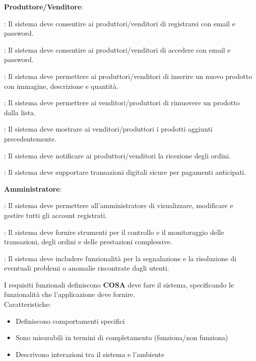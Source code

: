 \begin{rfenum}
    \item \textbf{Produttore/Venditore}:
        \begin{rfenum}
            \item : Il sistema deve consentire ai produttori/venditori di registrarsi con email e password.
            \item : Il sistema deve consentire ai produttori/venditori di accedere con email e password.
            \item : Il sistema deve permettere ai produttori/venditori di inserire un nuovo prodotto con immagine, descrizione e quantità.
            \item: Il sistema deve permettere ai venditori/produttori di rimuovere un prodotto dalla lista.
            \item: Il sistema deve mostrare ai venditori/produttori i prodotti aggiunti precedentemente.
            \item : Il sistema deve notificare ai produttori/venditori la ricezione degli ordini.
            \item : Il sistema deve supportare transazioni digitali sicure per pagamenti anticipati.
        \end{rfenum}
        
    \item \textbf{Amministratore}:
        \begin{rfenum}
            \item : Il sistema deve permettere all'amministratore di visualizzare, modificare e gestire tutti gli account registrati.
            \item : Il sistema deve fornire strumenti per il controllo e il monitoraggio delle transazioni, degli ordini e delle prestazioni complessive.
            \item : Il sistema deve includere funzionalità per la segnalazione e la risoluzione di eventuali problemi o anomalie riscontrate dagli utenti.
        \end{rfenum}
\end{rfenum}

\newpage
I requisiti funzionali definiscono \textbf{COSA} deve fare il sistema, specificando le funzionalità che l'applicazione deve fornire.\\
Caratteristiche:
\begin{itemize}
    \item Definiscono comportamenti specifici
    \item Sono misurabili in termini di completamento (funziona/non funziona)
    \item Descrivono interazioni tra il sistema e l'ambiente
\end{itemize}

